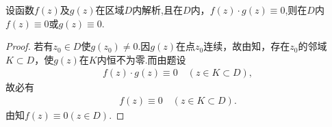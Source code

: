 \documentclass[../../main.tex]{subfiles}%
\begin{document}
\begin{proposition}
设函数$f(z)$及$g(z)$在区域$D$内解析,且在$D$内，$f(z)\cdot g(z)\equiv0$,则在$D$内$f(z)\equiv0$或$g(z)\equiv0$.
\end{proposition}
\begin{proof}
若有$z_0\in D$使$g(z_0)\neq0$.因$g(z)$在点$z_0$连续，故由知，存在$z_0$的邻域$K\subset D$，使$g(z)$在$K$内恒不为零.而由题设
\begin{align*}
f(z)\cdot g(z)\equiv0\quad (z\in K\subset D),
\end{align*}
故必有
\begin{align*}
f(z)\equiv0\quad (z\in K\subset D).
\end{align*}
由知$f(z)\equiv0(z\in D)$.
\end{proof}
\end{document}
